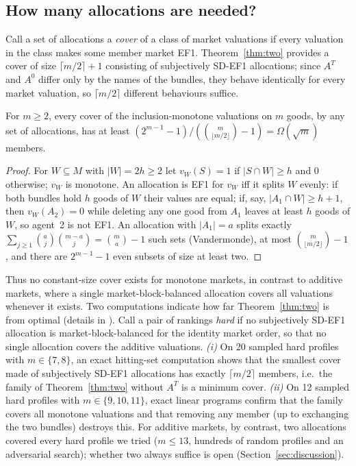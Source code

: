 \documentclass[sigconf,anonymous]{aamas}
\begin{document}
\subsection{How many allocations are needed?}\label{sec:family}
Call a set of allocations a \emph{cover} of a class of market valuations if every valuation in the class makes some member market EF1. Theorem~\ref{thm:two} provides a cover of size $\lceil m/2\rceil+1$ consisting of subjectively SD-EF1 allocations; since $A^T$ and $A^0$ differ only by the names of the bundles, they behave identically for every market valuation, so $\lceil m/2\rceil$ different behaviours suffice.

\begin{proposition}\label{prop:size}
For $m\ge2$, every cover of the inclusion-monotone valuations on $m$ goods, by any set of allocations, has at least $(2^{m-1}-1)/(\binom{m}{\lfloor m/2\rfloor}-1)=\Omega(\sqrt m)$ members.
\end{proposition}
\begin{proof}
For $W\subseteq M$ with $|W|=2h\ge2$ let $v_W(S)=1$ if $|S\cap W|\ge h$ and $0$ otherwise; $v_W$ is monotone. An allocation is EF1 for $v_W$ iff it splits $W$ evenly: if both bundles hold $h$ goods of $W$ their values are equal; if, say, $|A_1\cap W|\ge h+1$, then $v_W(A_2)=0$ while deleting any one good from $A_1$ leaves at least $h$ goods of $W$, so agent~2 is not EF1. An allocation with $|A_1|=a$ splits exactly $\sum_{j\ge1}\binom aj\binom{m-a}j=\binom ma-1$ such sets (Vandermonde), at most $\binom m{\lfloor m/2\rfloor}-1$, and there are $2^{m-1}-1$ even subsets of size at least two.
\end{proof}

Thus no constant-size cover exists for monotone markets, in contrast to additive markets, where a single market-block-balanced allocation covers all valuations whenever it exists. Two computations indicate how far Theorem~\ref{thm:two} is from optimal (details in \appFamily). Call a pair of rankings \emph{hard} if no subjectively SD-EF1 allocation is market-block-balanced for the identity market order, so that no single allocation covers the additive valuations. \emph{(i)} On 20 sampled hard profiles with $m\in\{7,8\}$, an exact hitting-set computation shows that the smallest cover made of subjectively SD-EF1 allocations has exactly $\lceil m/2\rceil$ members, i.e.\ the family of Theorem~\ref{thm:two} without $A^T$ is a minimum cover. \emph{(ii)} On 12 sampled hard profiles with $m\in\{9,10,11\}$, exact linear programs confirm that the family covers all monotone valuations and that removing any member (up to exchanging the two bundles) destroys this. For additive markets, by contrast, two allocations covered every hard profile we tried ($m\le13$, hundreds of random profiles and an adversarial search); whether two always suffice is open (Section~\ref{sec:discussion}).
\end{document}
